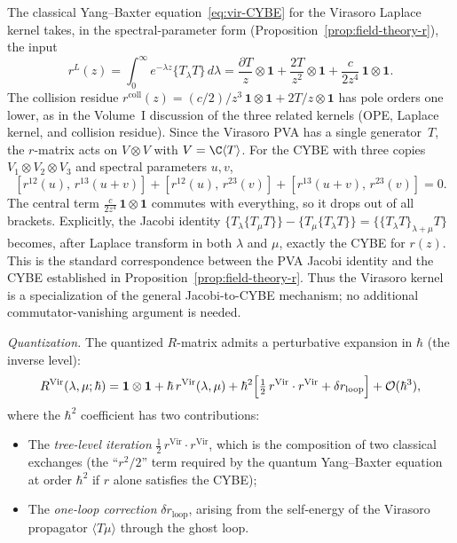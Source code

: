 \begin{computation}
\label{comp:vir-CYBE}
The classical Yang--Baxter equation~\eqref{eq:vir-CYBE}
for the Virasoro Laplace kernel takes, in the spectral-parameter form
(Proposition~\ref{prop:field-theory-r}), the input
\[
r^L(z)
= \int_0^\infty e^{-\lambda z} \{T_\lambda T\}\,d\lambda
= \frac{\partial T}{z} \otimes \mathbf{1}
 + \frac{2T}{z^2} \otimes \mathbf{1}
 + \frac{c}{2z^4}\,\mathbf{1}\otimes\mathbf{1}.
\]
The collision residue $r^{\mathrm{coll}}(z) = (c/2)/z^3\,
\mathbf{1}\otimes\mathbf{1} + 2T/z\otimes\mathbf{1}$ has pole
orders one lower, as in the Volume~I discussion of the three related
kernels (OPE, Laplace kernel, and collision residue).
Since the Virasoro PVA has a single generator~$T$, the $r$-matrix
acts on $V \otimes V$ with $V = \C\langle T \rangle$.
For the CYBE with three copies $V_1 \otimes V_2 \otimes V_3$ and
spectral parameters $u, v$,
\[
[r^{12}(u),\, r^{13}(u+v)]
+ [r^{12}(u),\, r^{23}(v)]
+ [r^{13}(u+v),\, r^{23}(v)]
= 0.
\]
The central term $\frac{c}{2z^4}\,\mathbf{1}\otimes\mathbf{1}$
commutes with everything, so it drops out of all brackets.
Explicitly, the Jacobi identity
$\{T_\lambda\{T_\mu T\}\} - \{T_\mu\{T_\lambda T\}\}
= \{\{T_\lambda T\}_{\lambda+\mu} T\}$
becomes, after Laplace transform in both $\lambda$ and $\mu$,
exactly the CYBE for $r(z)$. This is the standard
correspondence between the PVA Jacobi identity and the CYBE
established in Proposition~\ref{prop:field-theory-r}. Thus the
Virasoro kernel is a specialization of the general Jacobi-to-CYBE
mechanism; no additional commutator-vanishing argument is needed.
\end{computation}

\medskip
\noindent\emph{Quantization.}
The quantized $R$-matrix admits a
perturbative expansion in $\hbar$ (the inverse level):
\begin{equation}
\label{eq:vir-R-expansion}
R^{\text{Vir}}(\lambda, \mu; \hbar)
= \mathbf{1} \otimes \mathbf{1}
 + \hbar\, r^{\text{Vir}}(\lambda,\mu)
 + \hbar^2 \Bigl[\tfrac{1}{2}\, r^{\text{Vir}} \cdot r^{\text{Vir}}
 + \delta r_{\text{loop}}\Bigr]
 + \mathcal{O}(\hbar^3),
\end{equation}
where the $\hbar^2$ coefficient has two contributions:
\begin{itemize}
\item The \emph{tree-level iteration}
$\tfrac{1}{2}\,r^{\text{Vir}} \cdot r^{\text{Vir}}$, which is
the composition of two classical exchanges (the ``$r^2/2$''
term required by the quantum Yang--Baxter equation at order
$\hbar^2$ if $r$ alone satisfies the CYBE);
\item The \emph{one-loop correction} $\delta r_{\text{loop}}$,
arising from the self-energy of the Virasoro propagator
$\langle T\mu \rangle$ through the ghost loop.
\end{itemize}

